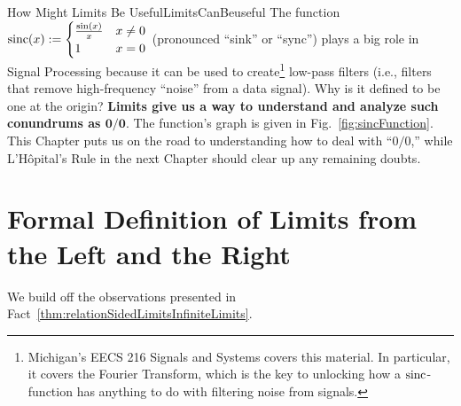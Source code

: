 \begin{funColor}{How Might Limits Be Useful}{LimitsCanBeuseful}
   The function ${\rm sinc}(x):= \begin{cases}
       \frac{\sin(x)}{x} & x \ne 0 \\
       1 & x = 0
   \end{cases}$
   (pronounced ``sink'' or ``sync'') plays a big role in Signal Processing because it can be used to create\footnote{Michigan's EECS 216 Signals and Systems covers this material. In particular, it covers the Fourier Transform, which is the key to unlocking how a ${\rm sinc}$-function has anything to do with filtering noise from signals.} low-pass filters (i.e., filters that remove high-frequency ``noise'' from a data signal). Why is it defined to be one at the origin? \textbf{Limits give us a way to understand and analyze such conundrums as $\bm{0/0}$}. The function's graph is given in Fig.~\ref{fig:sincFunction}. \\
   
   This Chapter puts us on the road to understanding how to deal with ``$0/0$,'' while L'H\^opital's Rule in the next Chapter should clear up any remaining doubts.   
\end{funColor}



\section{Formal Definition of Limits from the Left and the Right}

We build off the observations presented in Fact~\ref{thm:relationSidedLimitsInfiniteLimits}.




